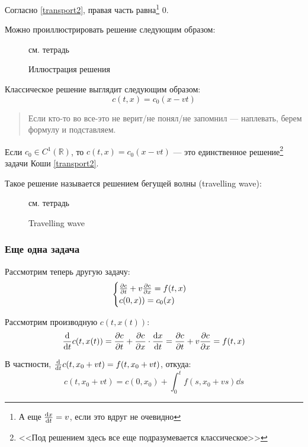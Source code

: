 Согласно \eqref{transport2}, правая часть равна\footnote{А еще $\dv{x}{t} = v$, если это вдруг не очевидно} $0$.

Можно проиллюстрировать решение следующим образом:
%
\begin{figure}[ht]
  \centering
  {\color{gray} см. тетрадь}
  \caption{Иллюстрация решения}
\end{figure}

Классическое решение выглядит следующим образом:
%
\begin{equation}
  c(t, x) = c_0(x - vt)
\end{equation}

\begin{quote}
  Если кто-то во все-это не верит/не понял/не запомнил --- наплевать, берем формулу и подставляем.
\end{quote}

\begin{thm}
  Если $c_0 \in C^1(\mathbb{R})$, то $c(t, x) = c_0(x - vt)$ --- это единственное решение\footnote{<<Под решением здесь все еще подразумевается классическое>>} задачи Коши \eqref{transport2}.
\end{thm}

Такое решение называется решением бегущей волны (travelling wave):
%
\begin{figure}[ht]
  \centering
  {\color{gray} см. тетрадь}
  \caption{Travelling wave}
\end{figure}

\subsubsection{Еще одна задача}

Рассмотрим теперь другую задачу:
%
\begin{equation}
  \begin{cases}
    \pdv{c}{t} + v \pdv{c}{x} = f(t, x) \\
    c(0, x)) = c_0(x)
  \end{cases} \label{cauchy2}
\end{equation}

Рассмотрим производную $c(t, x(t))$:
%
\begin{equation}
  \dv{t} c(t, x(t)) = \pdv{c}{t} + \pdv{c}{x} \cdot \dv{x}{t} = \pdv{c}{t} + v \pdv{c}{x} = f(t, x)
\end{equation}

В частности, $\dv{t} c(t, x_0 + vt) = f(t, x_0 + vt)$, откуда:
%
\begin{equation}
  c(t, x_0 + vt) = c(0, x_0) + \int_0^t f(s, x_0 + vs) \dd s
\end{equation}

